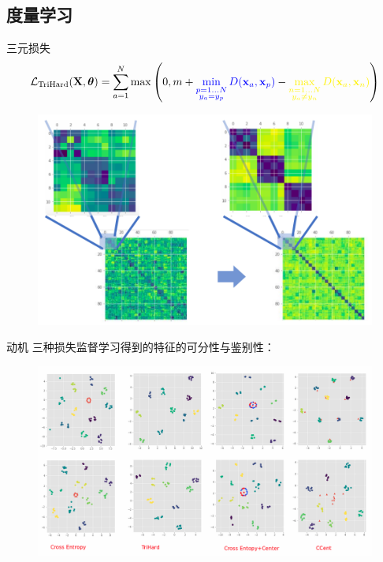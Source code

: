 \documentclass[notes]{beamer}
\begin{document}
\subsection{度量学习}
\begin{frame}{三元损失}
	\begin{equation}
		\cL_{\textrm{TriHard}} (\mX, \vtheta) = \sum_{a=1}^{N} \max\left(
		0, m +
		{\color{blue}
		\min_{\substack{
				p=1...N \\
				y_a = y_p}
		} D(\vx_a, \vx_p) }
		-
		{ \color{yellow}
		\max_{ \substack{
				n=1...N \\
				y_a \neq y_n }
		} D(\vx_a,\vx_n) }
		\right) \label{eq:trihard}
	\end{equation}
	\begin{figure}
		\centering
		\includegraphics[width=.7\textwidth]{fig/2018-05-19-23-27-39.png}
		\label{fig:distmat-tri}
	\end{figure}
\end{frame}

\begin{frame}{动机}
	三种损失监督学习得到的特征的可分性与鉴别性：
	\begin{figure}
		\centering
		\includegraphics[width=1.1\textwidth]{fig/2018-05-16-15-03-54.png}
		\label{fig:losses}
	\end{figure}
\end{frame}
\end{document}
